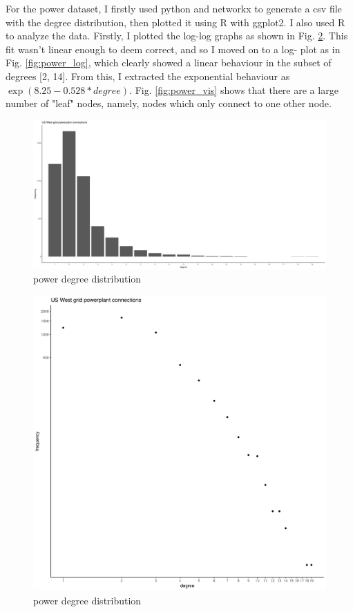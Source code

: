 \documentclass[a4paper]{article}
\begin{document}
\begin{enumerate}[label={(1.\alph*):}]
        For the power dataset, I firstly used python and networkx to generate a csv file with the degree distribution, then plotted it using R with ggplot2. I also used R to analyze the data. Firstly, I plotted the log-log graphs as shown in Fig. \ref{fig:power_loglog}. This fit wasn't linear enough to deem correct, and so I moved on to a log- plot as in Fig. \ref{fig:power_log}, which clearly showed a linear behaviour in the subset of degrees [2, 14]. From this, I extracted the exponential behaviour as $\exp(8.25-0.528* degree) $. Fig. \ref{fig:power_vis} shows that there are a large number of "leaf" nodes, namely, nodes which only connect to one other node.  

        \begin{figure}
            \includegraphics[width=\linewidth]{./power_degree_dist.png}
            \caption{power degree distribution}
            \label{fig:power_deg}
        \end{figure}

        \begin{figure}
            \includegraphics[width=\linewidth]{./power_deg_dist_loglog.png}
            \caption{power degree distribution}
            \label{fig:power_loglog}
        \end{figure}


\end{enumerate}
\end{document}
